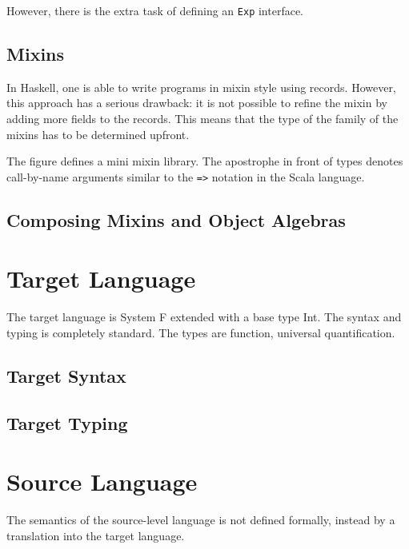 \documentclass[preprint]{sigplanconf}
\begin{document}
However, there is the extra task of defining an \lstinline{Exp} interface.



\subsection{Mixins}



In Haskell, one is able to write programs in mixin style using records. However,
this approach has a serious drawback: it is not possible to refine the mixin by
adding more fields to the records. This means that the type of the family of the
mixins has to be determined upfront.

The figure defines a mini mixin library. The apostrophe in front of types
denotes call-by-name arguments similar to the \lstinline{=>} notation in the
Scala language.

\subsection{Composing Mixins and Object Algebras}

\section{Target Language}

The target language is System F extended with a base type Int. The syntax and
typing is completely standard. The types are function, universal quantification.

\subsection{Target Syntax}

\subsection{Target Typing}

\section{Source Language}

The semantics of the source-level language is not defined formally, instead by a
translation into the target language.
\end{document}

